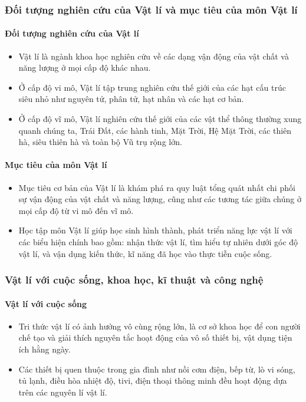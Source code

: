 
\subsubsection{Đối tượng nghiên cứu của Vật lí và mục tiêu của môn Vật lí}
\paragraph{Đối tượng nghiên cứu của Vật lí}
\begin{itemize}
\item Vật lí là ngành khoa học nghiên cứu về các dạng vận động của vật chất và năng lượng ở mọi cấp độ khác nhau.
\item Ở cấp độ vi mô, Vật lí tập trung nghiên cứu thế giới của các hạt cấu trúc siêu nhỏ như nguyên tử, phân tử, hạt nhân và các hạt cơ bản.
\item Ở cấp độ vĩ mô, Vật lí nghiên cứu thế giới của các vật thể thông thường xung quanh chúng ta, Trái Đất, các hành tinh, Mặt Trời, Hệ Mặt Trời, các thiên hà, siêu thiên hà và toàn bộ Vũ trụ rộng lớn.
\end{itemize}
\paragraph{Mục tiêu của môn Vật lí}
\begin{itemize}
\item Mục tiêu cơ bản của Vật lí là khám phá ra quy luật tổng quát nhất chi phối sự vận động của vật chất và năng lượng, cũng như các tương tác giữa chúng ở mọi cấp độ từ vi mô đến vĩ mô.
\item Học tập môn Vật lí giúp học sinh hình thành, phát triển năng lực vật lí với các biểu hiện chính bao gồm: nhận thức vật lí, tìm hiểu tự nhiên dưới góc độ vật lí, và vận dụng kiến thức, kĩ năng đã học vào thực tiễn cuộc sống.
\end{itemize}

\subsubsection{Vật lí với cuộc sống, khoa học, kĩ thuật và công nghệ}
\paragraph{Vật lí với cuộc sống}
\begin{itemize}
\item Tri thức vật lí có ảnh hưởng vô cùng rộng lớn, là cơ sở khoa học để con người chế tạo và giải thích nguyên tắc hoạt động của vô số thiết bị, vật dụng tiện ích hằng ngày.
\item Các thiết bị quen thuộc trong gia đình như nồi cơm điện, bếp từ, lò vi sóng, tủ lạnh, điều hòa nhiệt độ, tivi, điện thoại thông minh đều hoạt động dựa trên các nguyên lí vật lí.
\end{itemize}
